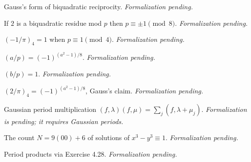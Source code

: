 \begin{theorem}[Exercise 4.25(b)]
  \label{exr:s4_25_b}
  \notready
  Gauss's form of biquadratic reciprocity. \emph{Formalization pending.}
\end{theorem}

\begin{theorem}[Exercise 4.26]
  \label{exr:s4_26}
  \notready
  If $2$ is a biquadratic residue mod $p$ then $p \equiv \pm1 \pmod 8$.
  \emph{Formalization pending.}
\end{theorem}

\begin{theorem}[Exercise 4.27(a)]
  \label{exr:s4_27_a}
  \notready
  $(-1/\pi)_4 = 1$ when $p \equiv 1 \pmod 4$. \emph{Formalization pending.}
\end{theorem}

\begin{theorem}[Exercise 4.27(b)]
  \label{exr:s4_27_b}
  \notready
  $(a/p) = (-1)^{(a^2-1)/8}$. \emph{Formalization pending.}
\end{theorem}

\begin{theorem}[Exercise 4.27(c)]
  \label{exr:s4_27_c}
  \notready
  $(b/p) = 1$. \emph{Formalization pending.}
\end{theorem}

\begin{theorem}[Exercise 4.27(d)]
  \label{exr:s4_27_d}
  \notready
  $(2/\pi)_4 = (-1)^{(a^2-1)/8}$, Gauss's claim. \emph{Formalization pending.}
\end{theorem}

\begin{theorem}[Exercise 4.28]
  \label{exr:s4_28}
  \notready
  Gaussian period multiplication $(f,\lambda)(f,\mu) = \sum_j (f,\lambda+\mu_j)$.
  \emph{Formalization is pending; it requires Gaussian periods.}
\end{theorem}

\begin{theorem}[Exercise 4.29(a)]
  \label{exr:s4_29_a}
  \notready
  The count $N = 9(00) + 6$ of solutions of $x^3 - y^3 \equiv 1$. \emph{Formalization pending.}
\end{theorem}

\begin{theorem}[Exercise 4.29(b)]
  \label{exr:s4_29_b}
  \notready
  Period products via Exercise 4.28. \emph{Formalization pending.}
\end{theorem}

